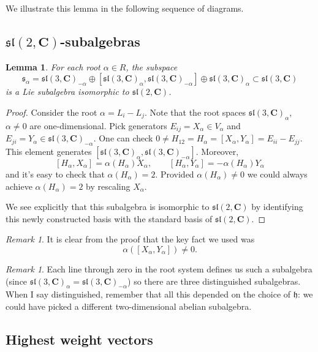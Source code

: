 \documentclass[12pt]{article}
\newcommand{\CC}{\mathbf{C}}
\newtheorem{lma}[thm]{Lemma}
\theoremstyle{definition}
\theoremstyle{check}
\theoremstyle{remark}
\newtheorem{rmk}[thm]{Remark}
\theoremstyle{TheoremNum}
\begin{document}
We illustrate this lemma in the following sequence of diagrams.

\sladj

\subsection{\texorpdfstring{$\mathfrak{sl}(2,\CC)$}{sl(2,C)}-subalgebras}

\begin{lma}
For each root $\alpha\in R$, the subspace
\[\mathfrak{s}_{\alpha}=\mathfrak{sl}(3,\CC)_{-\alpha}\oplus[\mathfrak{sl}(3,\CC)_{\alpha},\mathfrak{sl}(3,\CC)_{-\alpha}]\oplus \mathfrak{sl}(3,\CC)_{\alpha}\subset\mathfrak{sl}(3,\CC)\]
is a Lie subalgebra isomorphic to $\mathfrak{sl}(2,\CC)$.
\end{lma}
\begin{proof}
Consider the root $\alpha=L_i-L_j$. Note that the root spaces $\mathfrak{sl}(3,\CC)_{\alpha}$, $\alpha\neq 0$ are one-dimensional. Pick generators $E_{ij}=X_{\alpha}\in V_{\alpha}$ and $E_{ji}=Y_{\alpha}\in \mathfrak{sl}(3,\CC)_{-\alpha}$. One can check $0\neq H_{12}=H_{\alpha}=[X_{\alpha},Y_{\alpha}]=E_{ii}-E_{jj}$. This element generates $[\mathfrak{sl}(3,\CC)_{\alpha},\mathfrak{sl}(3,\CC)_{-\alpha}]$. Moreover,
\[[H_{\alpha},X_{\alpha}]=\alpha(H_{\alpha})X_{\alpha},\qquad [H_{\alpha},Y_{\alpha}]=-\alpha(H_{\alpha})Y_{\alpha}\]
and it's easy to check that $\alpha(H_{\alpha})=2$. Provided $\alpha(H_{\alpha})\neq 0$ we could always achieve $\alpha(H_{\alpha})=2$ by rescaling $X_{\alpha}$.

We see explicitly that this subalgebra is isomorphic to $\mathfrak{sl}(2,\CC)$ by identifying this newly constructed basis with the standard basis of $\mathfrak{sl}(2,\CC)$.
\end{proof}

\begin{rmk}
It is clear from the proof that the key fact we used was
\[\alpha([X_{\alpha},Y_{\alpha}])\neq 0.\]
\end{rmk}
\begin{rmk}
Each line through zero in the root system defines us such a subalgebra (since $\mathfrak{sl}(3,\CC)_{\alpha}=\mathfrak{sl}(3,\CC)_{-\alpha}$) so there are three distinguished subalgebras. When I say distinguished, remember that all this depended on the choice of $\mathfrak{h}$: we could have picked a different two-dimensional abelian subalgebra.
\end{rmk}

\subsection{Highest weight vectors}
\end{document}
